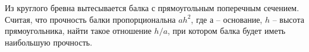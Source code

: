 \documentclass[russian]{article}
\begin{document}
Из круглого бревна вытесывается балка с прямоугольным поперечным сечением. Считая, что прочность балки пропорциональна $ah^2$, где $а$ -- основание, $h$ -- высота прямоугольника, найти такое отношение $h/a$, при котором балка будет иметь наибольшую прочность.

 
\end{document}
